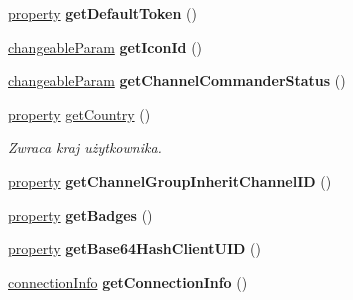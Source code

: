 \begin{DoxyCompactItemize}
\item 
\hyperlink{struct_ts3_api_1_1property}{property} {\bfseries get\+Default\+Token} ()\hypertarget{class_ts3_api_1_1_client_ada968043c62d3e2ae4799ac8aac76e10}{}\label{class_ts3_api_1_1_client_ada968043c62d3e2ae4799ac8aac76e10}

\item 
\hyperlink{struct_ts3_api_1_1_client_1_1changeable_param}{changeable\+Param} {\bfseries get\+Icon\+Id} ()\hypertarget{class_ts3_api_1_1_client_a130b1601b40d9e2062d767aa6c68c42d}{}\label{class_ts3_api_1_1_client_a130b1601b40d9e2062d767aa6c68c42d}

\item 
\hyperlink{struct_ts3_api_1_1_client_1_1changeable_param}{changeable\+Param} {\bfseries get\+Channel\+Commander\+Status} ()\hypertarget{class_ts3_api_1_1_client_a6387e63b888385926fee0c8c98fbdbde}{}\label{class_ts3_api_1_1_client_a6387e63b888385926fee0c8c98fbdbde}

\item 
\hyperlink{struct_ts3_api_1_1property}{property} \hyperlink{class_ts3_api_1_1_client_a6fbf02bbe944a5922cccc1ba2e8b9468}{get\+Country} ()\hypertarget{class_ts3_api_1_1_client_a6fbf02bbe944a5922cccc1ba2e8b9468}{}\label{class_ts3_api_1_1_client_a6fbf02bbe944a5922cccc1ba2e8b9468}

\begin{DoxyCompactList}\small\item\em Zwraca kraj użytkownika. \end{DoxyCompactList}\item 
\hyperlink{struct_ts3_api_1_1property}{property} {\bfseries get\+Channel\+Group\+Inherit\+Channel\+ID} ()\hypertarget{class_ts3_api_1_1_client_aff139d60eae2d6a65a4865f5401840e8}{}\label{class_ts3_api_1_1_client_aff139d60eae2d6a65a4865f5401840e8}

\item 
\hyperlink{struct_ts3_api_1_1property}{property} {\bfseries get\+Badges} ()\hypertarget{class_ts3_api_1_1_client_a409ee9196f1db33a8c29d82d9f808cf4}{}\label{class_ts3_api_1_1_client_a409ee9196f1db33a8c29d82d9f808cf4}

\item 
\hyperlink{struct_ts3_api_1_1property}{property} {\bfseries get\+Base64\+Hash\+Client\+U\+ID} ()\hypertarget{class_ts3_api_1_1_client_a37dbbf574ee7bc480916ccae844b3d30}{}\label{class_ts3_api_1_1_client_a37dbbf574ee7bc480916ccae844b3d30}

\item 
\hyperlink{struct_ts3_api_1_1_client_1_1connection_info}{connection\+Info} {\bfseries get\+Connection\+Info} ()\hypertarget{class_ts3_api_1_1_client_a59fb7b7c522625c35a1d1a8e7e125d5a}{}\label{class_ts3_api_1_1_client_a59fb7b7c522625c35a1d1a8e7e125d5a}


\end{DoxyCompactItemize}
